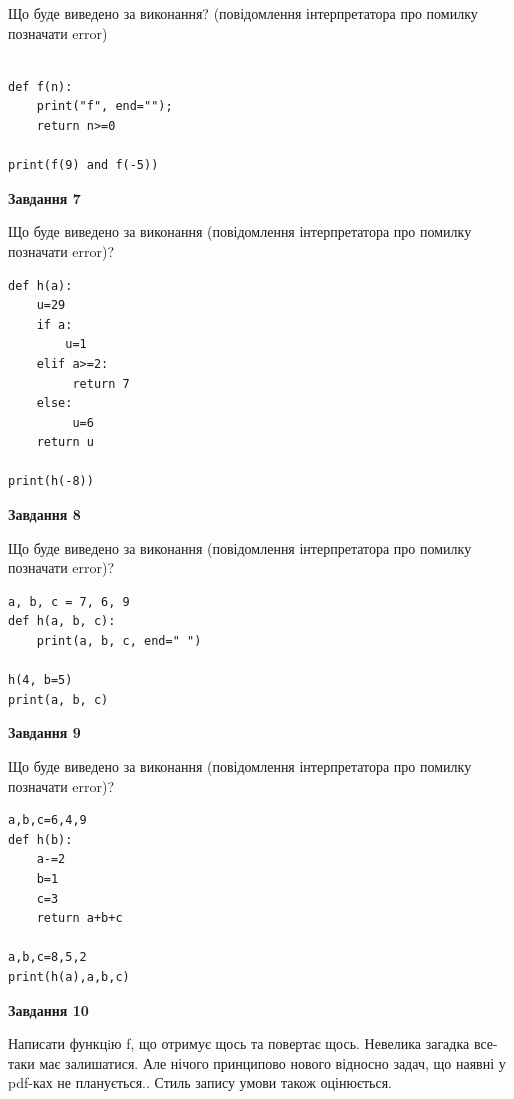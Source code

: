 \documentclass[12pt, ukrainian]{article}
\begin{document}
{\begin {large}
Що буде виведено за виконання? (повідомлення інтерпретатора про помилку позначати error)\par
\begin{verbatim}

def f(n):
    print("f", end="");
    return n>=0

print(f(9) and f(-5))
\end{verbatim}

{\begin {center}\textbf{Завдання 7}\end {center}}

Що буде виведено за виконання (повідомлення інтерпретатора про помилку позначати error)?\par
\begin{verbatim}
def h(a):
    u=29
    if a: 
        u=1
    elif a>=2:
         return 7
    else:
         u=6
    return u

print(h(-8))
\end{verbatim}

{\begin {center}\textbf{Завдання 8}\end {center}}

Що буде виведено за виконання (повідомлення інтерпретатора про помилку позначати error)?\par
\begin{verbatim}
a, b, c = 7, 6, 9
def h(a, b, c):
    print(a, b, c, end=" ")

h(4, b=5)
print(a, b, c)
\end{verbatim}

{\begin {center}\textbf{Завдання 9}\end {center}}

Що буде виведено за виконання (повідомлення інтерпретатора про помилку позначати error)?\par
\begin{verbatim}
a,b,c=6,4,9
def h(b):
    a-=2
    b=1
    c=3
    return a+b+c

a,b,c=8,5,2
print(h(a),a,b,c)
\end{verbatim}

{\begin {center}\textbf{Завдання 10}\end {center}}


Написати функцiю f, що отримує щось та повертає щось. Невелика загадка все-таки має залишатися. Але нічого принципово нового відносно задач, що наявні у pdf-ках не планується.. Стиль запису умови також оцінюється.\par
\end {large}}
\newpage
\end{document}

